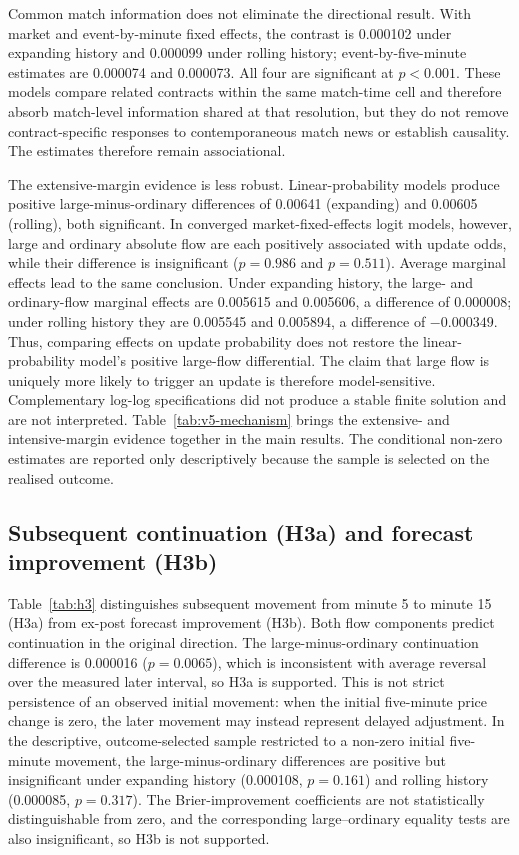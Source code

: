 Common match information does not eliminate the directional result. With
market and event-by-minute fixed effects, the contrast is 0.000102 under
expanding history and 0.000099 under rolling history; event-by-five-minute
estimates are 0.000074 and 0.000073. All four are significant at $p<0.001$.
These models compare related contracts within the same match-time cell and
therefore absorb match-level information shared at that resolution, but they do
not remove contract-specific responses to contemporaneous match news or
establish causality. The estimates therefore remain associational.

The extensive-margin evidence is less robust. Linear-probability models produce
positive large-minus-ordinary differences of 0.00641 (expanding) and 0.00605
(rolling), both significant. In converged market-fixed-effects logit models,
however, large and ordinary absolute flow are each positively associated with
update odds, while their difference is insignificant ($p=0.986$ and $p=0.511$).
Average marginal effects lead to the same conclusion. Under expanding history,
the large- and ordinary-flow marginal effects are 0.005615 and 0.005606, a
difference of 0.000008; under rolling history they are 0.005545 and 0.005894,
a difference of $-0.000349$. Thus, comparing effects on update probability does
not restore the linear-probability model's positive large-flow differential.
The claim that large flow is uniquely more likely to trigger an update is
therefore model-sensitive. Complementary log-log specifications did not produce
a stable finite solution and are not interpreted. Table~\ref{tab:v5-mechanism}
brings the extensive- and intensive-margin evidence together in the main
results. The conditional non-zero estimates are reported only descriptively
because the sample is selected on the realised outcome.



\subsection{Subsequent continuation (H3a) and forecast improvement (H3b)}

Table~\ref{tab:h3} distinguishes subsequent movement from minute 5 to minute 15 (H3a) from ex-post forecast improvement (H3b). Both flow components predict continuation in the original direction. The large-minus-ordinary continuation difference is 0.000016 ($p=0.0065$), which is inconsistent with average reversal over the measured later interval, so H3a is supported. This is not strict persistence of an observed initial movement: when the initial five-minute price change is zero, the later movement may instead represent delayed adjustment. In the descriptive, outcome-selected sample restricted to a non-zero initial five-minute movement, the large-minus-ordinary differences are positive but insignificant under expanding history (0.000108, $p=0.161$) and rolling history (0.000085, $p=0.317$). The Brier-improvement coefficients are not statistically distinguishable from zero, and the corresponding large--ordinary equality tests are also insignificant, so H3b is not supported.


